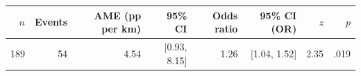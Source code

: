 \begin{tabular}{rrrrrrrr}
\toprule
$n$ & Events & AME (pp per km) & 95\% CI & Odds ratio & 95\% CI (OR) & $z$ & $p$ \\
\midrule
189 & 54 & 4.54 & [0.93, 8.15] & 1.26 & [1.04, 1.52] & 2.35 & .019 \\
\bottomrule
\end{tabular}
